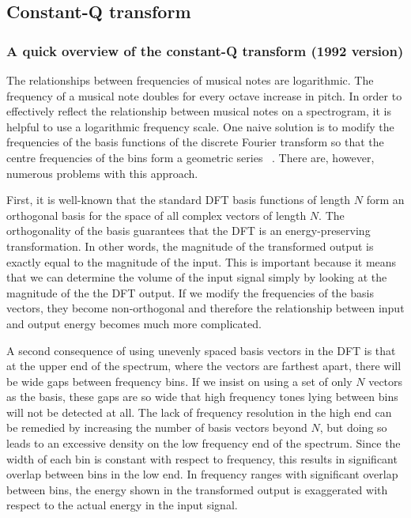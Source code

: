 \documentclass{ieeeaccess}
\begin{document}
\subsection{Constant-Q transform}
\subsubsection{A quick overview of the constant-Q transform (1992 version)}
The relationships between frequencies of musical notes are logarithmic. The frequency of a musical note doubles for every octave increase in pitch. In order to effectively reflect the relationship between musical notes on a spectrogram, it is helpful to use a logarithmic frequency scale. One naive solution is to modify the frequencies of the basis functions of the discrete Fourier transform so that the centre frequencies of the bins form a geometric series ~\cite{haines1988logarithmic}. There are, however, numerous problems with this approach. 


First, it is well-known that the standard DFT basis functions of length $N$ form an orthogonal basis for the space of all complex vectors of length $N$. The orthogonality of the basis guarantees that the DFT is an energy-preserving transformation. In other words, the magnitude of the transformed output is exactly equal to the magnitude of the input. This is important because it means that we can determine the volume of the input signal simply by looking at the magnitude of the the DFT output. If we modify the frequencies of the basis vectors, they become non-orthogonal and therefore the relationship between input and output energy becomes much more complicated. 


A second consequence of using unevenly spaced basis vectors in the DFT is that at the upper end of the spectrum, where the vectors are farthest apart, there will be wide gaps between frequency bins. If we insist on using a set of only $N$ vectors as the basis, these gaps are so wide that high frequency tones lying between bins will not be detected at all.
The lack of frequency resolution in the high end can be remedied by increasing the number of basis vectors beyond $N$, but doing so leads to an excessive density on the low frequency end of the spectrum. Since the width of each bin is constant with respect to frequency, this results in significant overlap between bins in the low end. In frequency ranges with significant overlap between bins, the energy shown in the transformed output is exaggerated with respect to the actual energy in the input signal.
\end{document}
